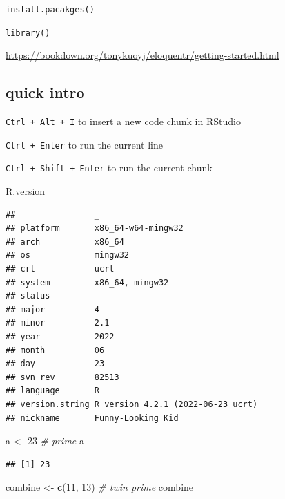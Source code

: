 \documentclass[
]{book}
\newenvironment{Shaded}{\begin{snugshade}}{\end{snugshade}}
\newcommand{\CommentTok}[1]{\textcolor[rgb]{0.56,0.35,0.01}{\textit{#1}}}
\newcommand{\DecValTok}[1]{\textcolor[rgb]{0.00,0.00,0.81}{#1}}
\newcommand{\FunctionTok}[1]{\textcolor[rgb]{0.13,0.29,0.53}{\textbf{#1}}}
\newcommand{\NormalTok}[1]{#1}
\newcommand{\OtherTok}[1]{\textcolor[rgb]{0.56,0.35,0.01}{#1}}
\theoremstyle{definition}
\theoremstyle{definition}
\theoremstyle{definition}
\theoremstyle{definition}
\theoremstyle{remark}
\begin{document}
\texttt{install.pacakges()}

\texttt{library()}

\url{https://bookdown.org/tonykuoyj/eloquentr/getting-started.html}

\subsection{quick intro}\label{quick-intro}

\texttt{Ctrl\ +\ Alt\ +\ I} to insert a new code chunk in RStudio

\texttt{Ctrl\ +\ Enter} to run the current line

\texttt{Ctrl\ +\ Shift\ +\ Enter} to run the current chunk

\begin{Shaded}
\begin{Highlighting}[]
\NormalTok{R.version}
\end{Highlighting}
\end{Shaded}

\begin{verbatim}
##                _                                
## platform       x86_64-w64-mingw32               
## arch           x86_64                           
## os             mingw32                          
## crt            ucrt                             
## system         x86_64, mingw32                  
## status                                          
## major          4                                
## minor          2.1                              
## year           2022                             
## month          06                               
## day            23                               
## svn rev        82513                            
## language       R                                
## version.string R version 4.2.1 (2022-06-23 ucrt)
## nickname       Funny-Looking Kid
\end{verbatim}

\begin{Shaded}
\begin{Highlighting}[]
\NormalTok{a }\OtherTok{\textless{}{-}} \DecValTok{23} \CommentTok{\# prime}
\NormalTok{a}
\end{Highlighting}
\end{Shaded}

\begin{verbatim}
## [1] 23
\end{verbatim}

\begin{Shaded}
\begin{Highlighting}[]
\NormalTok{combine }\OtherTok{\textless{}{-}} \FunctionTok{c}\NormalTok{(}\DecValTok{11}\NormalTok{, }\DecValTok{13}\NormalTok{) }\CommentTok{\# twin prime}
\NormalTok{combine}
\end{Highlighting}
\end{Shaded}
\end{document}
